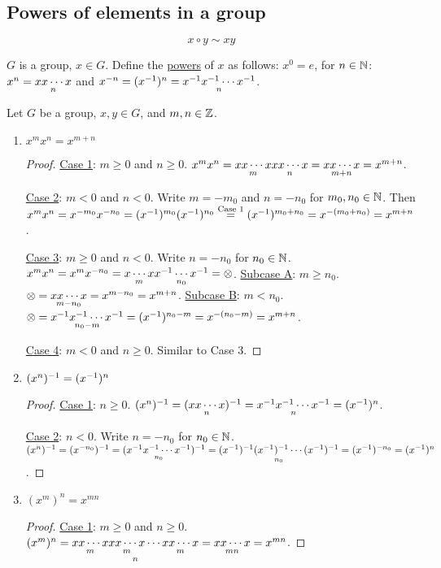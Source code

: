 \documentclass[]{article}
\begin{document}
\subsection{Powers of elements in a group}

$$x\circ y \sim xy$$

$G$ is a group, $x\in G$.
Define the \ul{powers} of $x$ as follows:
$x^0 = e$, for $n\in\mathbb{N}$: $x^n=\underset{n}{xx\cdots x}$ and $x^{-n} = (x^{-1})^n = \underset{n}{x^{-1} x^{-1}\cdots x^{-1}}$.

\begin{theorem}
	Let $G$ be a group, $x,y\in G$, and $m,n\in\mathbb{Z}$.
	\begin{enumerate}
		\item $x^mx^n = x^{m+n}$
			\begin{proof}
				\ul{Case 1}: $m\geq 0$ and $n\geq 0$. $x^mx^n = \underset{m}{xx\cdots x} \underset{n}{xx\cdots x} = \underset{m+n}{xx\cdots x} = x^{m+n}$.
				
				\ul{Case 2}: $m<0$ and $n<0$. Write $m = -m_0$ and $n=-n_0$ for $m_0,n_0\in\mathbb{N}$. Then $x^mx^n = x^{-m_0}x^{-n_0} = (x^{-1})^{m_0} (x^{-1})^{n_0} \overset{\text{Case 1}}{=} (x^{-1})^{m_0+n_0} = x^{-(m_0+n_0)} = x^{m+n}$.
				
				\ul{Case 3}: $m\geq 0$ and $n<0$. Write $n=-n_0$ for $n_0\in\mathbb{N}$.
				$x^mx^n = x^mx^{-n_0} = \underset{m}{x\cdots x}\underset{n_0}{x^{-1}\cdots x^{-1}} = \otimes$.
				\ul{Subcase A}: $m\geq n_0$. $\otimes = \underset{m-n_0}{xx\cdots x} = x^{m-n_0} = x^{m+n}$.
				\ul{Subcase B}: $m<n_0$. $\otimes = \underset{n_0-m}{x^{-1} x^{-1} \cdots x^{-1}} = (x^{-1})^{n_0-m} = x^{-(n_0-m)} = x^{m+n}$.

				\ul{Case 4}: $m<0$ and $n\geq 0$. Similar to Case 3.
			\end{proof}
		\item $(x^n)^{-1} = (x^{-1})^n$
			\begin{proof}
				\ul{Case 1}: $n\geq 0$. $(x^n)^{-1} = (\underset{n}{xx\cdots x})^{-1} = \underset{n}{x^{-1} x^{-1} \cdots x^{-1}} = (x^{-1})^n$.

				\ul{Case 2}: $n<0$. Write $n=-n_0$ for $n_0\in\mathbb{N}$. $(x^n)^{-1} = (x^{-n_0})^{-1} = (\underset{n_0}{x^{-1} x^{-1} \cdots x^{-1}})^{-1} = \underset{n_0}{(x^{-1})^{-1} (x^{-1})^{-1}\cdots(x^{-1})^{-1}} = (x^{-1})^{-n_0} = (x^{-1})^n$.
			\end{proof}
		\item $(x^m)^n = x^{mn}$
			\begin{proof}
				\ul{Case 1}: $m\geq 0$ and $n\geq 0$. $(x^m)^n = \underset{n}{\underset{m}{xx\cdots x}\underset{m}{xx\cdots x}\cdots\underset{m}{xx\cdots x}} = \underset{mn}{xx\cdots x} = x^{mn}$.
				

\end{proof}
\end{enumerate}
\end{theorem}
\end{document}
